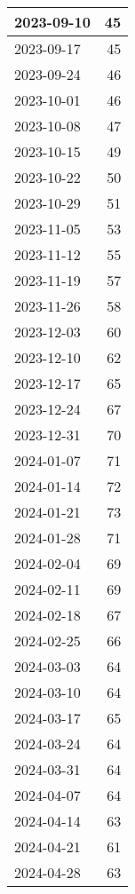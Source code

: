 \begin{longtable}[h!]{|l|r|}
2023-09-10 &            45 \\ \hline
2023-09-17 &            45 \\ \hline
2023-09-24 &            46 \\ \hline
2023-10-01 &            46 \\ \hline
2023-10-08 &            47 \\ \hline
2023-10-15 &            49 \\ \hline
2023-10-22 &            50 \\ \hline
2023-10-29 &            51 \\ \hline
2023-11-05 &            53 \\ \hline
2023-11-12 &            55 \\ \hline
2023-11-19 &            57 \\ \hline
2023-11-26 &            58 \\ \hline
2023-12-03 &            60 \\ \hline
2023-12-10 &            62 \\ \hline
2023-12-17 &            65 \\ \hline
2023-12-24 &            67 \\ \hline
2023-12-31 &            70 \\ \hline
2024-01-07 &            71 \\ \hline
2024-01-14 &            72 \\ \hline
2024-01-21 &            73 \\ \hline
2024-01-28 &            71 \\ \hline
2024-02-04 &            69 \\ \hline
2024-02-11 &            69 \\ \hline
2024-02-18 &            67 \\ \hline
2024-02-25 &            66 \\ \hline
2024-03-03 &            64 \\ \hline
2024-03-10 &            64 \\ \hline
2024-03-17 &            65 \\ \hline
2024-03-24 &            64 \\ \hline
2024-03-31 &            64 \\ \hline
2024-04-07 &            64 \\ \hline
2024-04-14 &            63 \\ \hline
2024-04-21 &            61 \\ \hline
2024-04-28 &            63 \\ \hline

\end{longtable}

